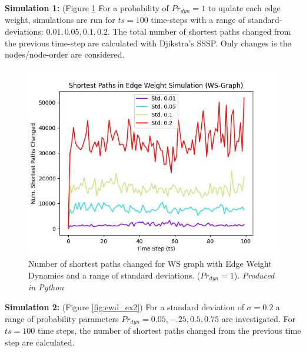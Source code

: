\documentclass[
	a4paper, %
	10pt, %
	unnumberedsections, %
	twoside, %
]{LTJournalArticle}
\begin{document}
\textbf{Simulation 1:} (Figure \ref{fig:ewd_ex1} For a probability of \(Pr_{dyn} = 1\) to update each edge weight, simulations are run for \(ts = 100\) time-steps with a range of standard-deviations: \(0.01, 0.05, 0.1, 0.2\). The total number of shortest paths changed from the previous time-step are calculated with Djikstra's SSSP. Only changes is the nodes/node-order are considered. 

\begin{figure}[H]
	\includegraphics[width=\linewidth]{Figures/ewd/ew1_paths_std.jpg}
	\caption{Number of shortest paths changed for WS graph with Edge Weight Dynamics and a range of standard deviations. (\(Pr_{dyn} = 1\)). \emph{Produced in Python}}
	\label{fig:ewd_ex1}
\end{figure}

\textbf{Simulation 2:} (Figure \ref{fig:ewd_ex2}) For a standard deviation of \(\sigma = 0.2\) a range of probability parameters \(Pr_{dyn} = 0.05, -.25, 0.5, 0.75\) are investigated. For \(ts = 100\) time steps, the number of shortest paths changed from the previous time step are calculated.
\end{document}
